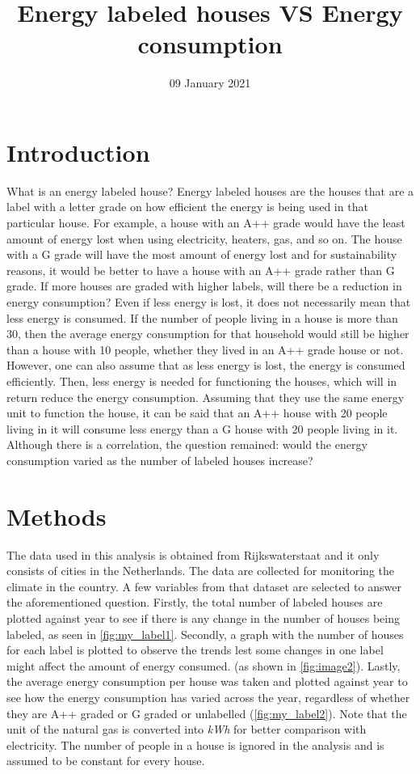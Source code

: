 \documentclass[a4paper,11pt]{article}
\title{Energy labeled houses VS Energy consumption}
\author{}
\date{09 January 2021}
\begin{document}
\maketitle

\section{Introduction}

What is an energy labeled house? Energy labeled houses are the houses that are a label with a letter grade on how efficient the energy is being used in that particular house. For example, a house with an A++ grade would have the least amount of energy lost when using electricity, heaters, gas, and so on. The house with a G grade will have the most amount of energy lost and for sustainability reasons, it would be better to have a house with an A++ grade rather than G grade. If more houses are graded with higher labels, will there be a reduction in energy consumption? Even if less energy is lost, it does not necessarily mean that less energy is consumed. If the number of people living in a house is more than 30, then the average energy consumption for that household would still be higher than a house with 10 people, whether they lived in an A++ grade house or not. However, one can also assume that as less energy is lost, the energy is consumed efficiently. Then, less energy is needed for functioning the houses, which will in return reduce the energy consumption. Assuming that they use the same energy unit to function the house, it can be said that an A++ house with 20 people living in it will consume less energy than a G house with 20 people living in it. Although there is a correlation, the question remained: would the energy consumption varied as the number of labeled houses increase? 

\section{Methods}
The data used in this analysis is obtained from Rijkswaterstaat \cite{Rijkswaterstaat} and it only consists of cities in the Netherlands. The data are collected for monitoring the climate in the country. A few variables from that dataset are selected to answer the aforementioned question. Firstly, the total number of labeled houses are plotted against year to see if there is any change in the number of houses being labeled, as seen in \autoref{fig:my_label1}. Secondly, a graph with the number of houses for each label is plotted to observe the trends lest some changes in one label might affect the amount of energy consumed. (as shown in \autoref{fig:image2}).  Lastly, the average energy consumption per house was taken and plotted against year to see how the energy consumption has varied across the year, regardless of whether they are A++ graded or G graded or unlabelled (\autoref{fig:my_label2}). Note that the unit of the natural gas is converted into \emph{kWh} for better comparison with electricity. The number of people in a house is ignored in the analysis and is assumed to be constant for every house.  
\end{document}
